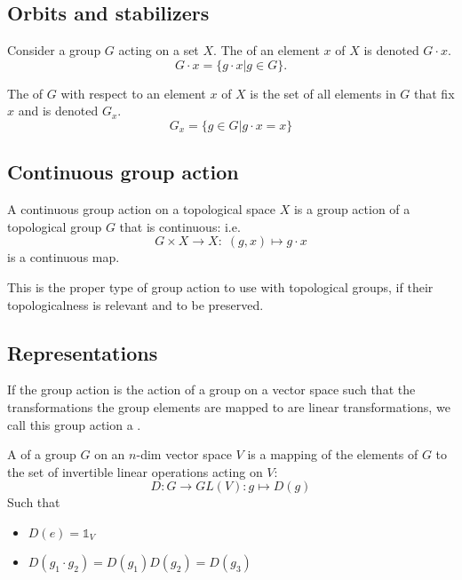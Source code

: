 \subsection{Orbits and stabilizers}
\begin{definition}
Consider a group $G$ acting on a set $X$. The  of an element $x$ of $X$ is denoted $G\cdot x$.
\[ G\cdot x = \{ g\cdot x | g\in G \}. \]
\end{definition}

The  of $G$ with respect to an element $x$ of $X$ is the set of all elements in $G$ that fix $x$ and is denoted $G_x$.
\[G_x = \{ g\in G | g\cdot x = x \} \]

\subsection{Continuous group action}
A continuous group action on a topological space $X$ is a group action of a topological group $G$ that is continuous: i.e.\,
\[G \times X \to X : \;(g, x) \mapsto g \cdot x \]
is a continuous map.

This is the proper type of group action to use with topological groups, if their topologicalness is relevant and to be preserved.

\subsection{Representations}
If the group action is the action of a group on a vector space such that the transformations the group elements are mapped to are linear transformations, we call this group action a .

\begin{definition}
A  of a group $G$ on an $n$-dim vector space $V$ is a mapping of the elements of $G$ to the set of invertible linear operations acting on $V$:
\[D: G \rightarrow GL(V): g \mapsto D(g)\]
Such that
\begin{itemize}
\item $D(e) = \mathbb{1}_V$
\item $D(g_1\cdot g_2) = D(g_1)D(g_2) = D(g_3)$
\end{itemize}
\end{definition}

